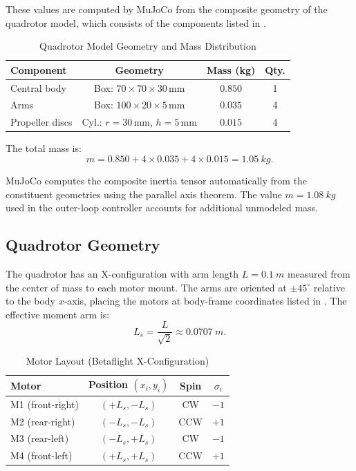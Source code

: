 \documentclass[journal]{IEEEtran}
\begin{document}
These values are computed by MuJoCo from the composite geometry of the quadrotor model, which consists of the components listed in .

\begin{table}[!t]
  \centering
  \caption{Quadrotor Model Geometry and Mass Distribution}
  \label{tab:geometry}
  \begin{tabular}{@{}lccc@{}}
    \toprule
    Component & Geometry & Mass (\si{kg}) & Qty. \\
    \midrule
    Central body & Box: $70\!\times\!70\!\times\!30$\,mm & $0.850$ & 1 \\
    Arms & Box: $100\!\times\!20\!\times\!5$\,mm & $0.035$ & 4 \\
    Propeller discs & Cyl.: $r\!=\!30$\,mm, $h\!=\!5$\,mm & $0.015$ & 4 \\
    \bottomrule
  \end{tabular}
\end{table}

The total mass is:
\begin{equation}
  m = 0.850 + 4 \times 0.035 + 4 \times 0.015 = \SI{1.05}{kg}.
  \label{eq:mass}
\end{equation}

\begin{remark}
  MuJoCo computes the composite inertia tensor automatically from the constituent geometries using the parallel axis theorem. The value $m = \SI{1.08}{kg}$ used in the outer-loop controller accounts for additional unmodeled mass.
\end{remark}

\subsection{Quadrotor Geometry}

The quadrotor has an X-configuration with arm length $L = \SI{0.1}{m}$ measured from the center of mass to each motor mount. The arms are oriented at $\pm 45^\circ$ relative to the body $x$-axis, placing the motors at body-frame coordinates listed in . The effective moment arm is:
\begin{equation}
  L_s = \frac{L}{\sqrt{2}} \approx \SI{0.0707}{m}.
  \label{eq:Ls}
\end{equation}

\begin{table}[!t]
  \centering
  \caption{Motor Layout (Betaflight X-Configuration)}
  \label{tab:motors}
  \begin{tabular}{@{}lccc@{}}
    \toprule
    Motor & Position $(x_i, y_i)$ & Spin & $\sigma_i$ \\
    \midrule
    M1 (front-right) & $(+L_s, -L_s)$ & CW & $-1$ \\
    M2 (rear-right) & $(-L_s, -L_s)$ & CCW & $+1$ \\
    M3 (rear-left) & $(-L_s, +L_s)$ & CW & $-1$ \\
    M4 (front-left) & $(+L_s, +L_s)$ & CCW & $+1$ \\
    \bottomrule
  \end{tabular}
\end{table}
\end{document}
